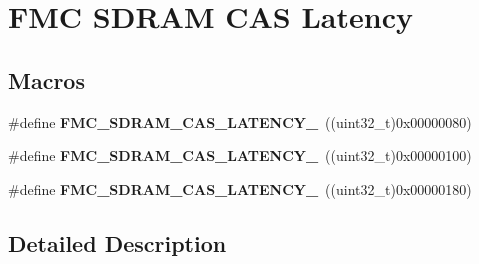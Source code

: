 \hypertarget{group___f_m_c___s_d_r_a_m___c_a_s___latency}{}\section{F\+MC S\+D\+R\+AM C\+AS Latency}
\label{group___f_m_c___s_d_r_a_m___c_a_s___latency}
\subsection*{Macros}
\begin{DoxyCompactItemize}
\item 
\#define {\bfseries F\+M\+C\+\_\+\+S\+D\+R\+A\+M\+\_\+\+C\+A\+S\+\_\+\+L\+A\+T\+E\+N\+C\+Y\+\_}~((uint32\+\_\+t)0x00000080)\hypertarget{group___f_m_c___s_d_r_a_m___c_a_s___latency_ga21331e86a5b3fc0a722576393b345658}{}\label{group___f_m_c___s_d_r_a_m___c_a_s___latency_ga21331e86a5b3fc0a722576393b345658}

\item 
\#define {\bfseries F\+M\+C\+\_\+\+S\+D\+R\+A\+M\+\_\+\+C\+A\+S\+\_\+\+L\+A\+T\+E\+N\+C\+Y\+\_}~((uint32\+\_\+t)0x00000100)\hypertarget{group___f_m_c___s_d_r_a_m___c_a_s___latency_gac8d25370782fd7f6403cc50c7a326654}{}\label{group___f_m_c___s_d_r_a_m___c_a_s___latency_gac8d25370782fd7f6403cc50c7a326654}

\item 
\#define {\bfseries F\+M\+C\+\_\+\+S\+D\+R\+A\+M\+\_\+\+C\+A\+S\+\_\+\+L\+A\+T\+E\+N\+C\+Y\+\_}~((uint32\+\_\+t)0x00000180)\hypertarget{group___f_m_c___s_d_r_a_m___c_a_s___latency_ga71368a9ab24ffc182e56c39173f409b9}{}\label{group___f_m_c___s_d_r_a_m___c_a_s___latency_ga71368a9ab24ffc182e56c39173f409b9}

\end{DoxyCompactItemize}


\subsection{Detailed Description}
